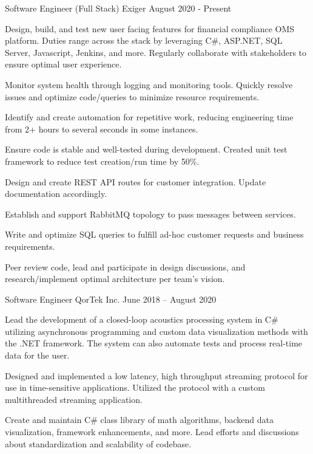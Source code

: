 \documentclass[]{awesome-cv}
\begin{document}
\vspace{-6mm}
\begin{cventries}
\linespread{1.40}
	\cventry
	{Software Engineer (Full Stack)}
	{Exiger}
	{}
	{August 2020 - Present}
	{\begin{cvitems}
		\item {Design, build, and test new user facing features for financial compliance OMS platform. Duties range across the stack by leveraging C\#, ASP.NET, SQL Server, Javascript, Jenkins, and more. Regularly collaborate with stakeholders to ensure optimal user experience.}
		\item {Monitor system health through logging and monitoring tools. Quickly resolve issues and optimize code/queries to minimize resource requirements. }
		\item {Identify and create automation for repetitive work, reducing engineering time from 2+ hours to several seconds in some instances.}
		\item {Ensure code is stable and well-tested during development. Created unit test framework to reduce test creation/run time by 50\%.}
		\item {Design and create REST API routes for customer integration. Update documentation accordingly.}
		\item {Establish and support RabbitMQ topology to pass messages between services.}
		\item {Write and optimize SQL queries to fulfill ad-hoc customer requests and business requirements.}
		\item {Peer review code, lead and participate in design discussions, and research/implement optimal architecture per team's vision.}
		\end{cvitems}}
	\cventry
	{Software Engineer}
	{QorTek Inc.}
	{}
	{June 2018 – August 2020}
	{\begin{cvitems}
		\item {Lead the development of a closed-loop acoustics processing system in C\# utilizing asynchronous programming and custom data visualization methods with the .NET framework. The system can also automate tests and process real-time data for the user.}
		\item {Designed and implemented a low latency, high throughput streaming protocol for use in time-sensitive applications. Utilized the protocol with a custom multithreaded streaming application.}
		\item {Create and maintain C\# class library of math algorithms, backend data visualization, framework enhancements, and more. Lead efforts and discussions about standardization and scalability of codebase.}

\end{cvitems}}
\end{cventries}
\end{document}
